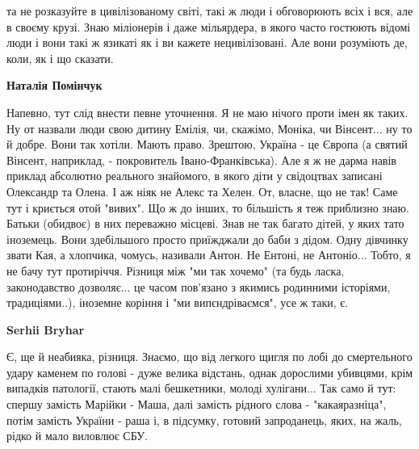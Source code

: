 \begin{itemize}
\begin{itemize}
та не розказуйте в цивілізованому світі, такі ж люди і обговорюють всіх і вся,
але в своєму крузі. Знаю міліонерів і даже мільярдера, в якого часто гостюють
відомі люди і вони такі ж язикаті як і ви кажете нецивілізовані. Але вони
розуміють де, коли, як і що сказати.


 
\textbf{Наталія Помінчук} 

Напевно, тут слід внести певне уточнення. Я не маю нічого проти імен як таких.
Ну от назвали люди свою дитину Емілія, чи, скажімо, Моніка, чи Вінсент... ну то
й добре. Вони так хотіли. Мають право. Зрештою, Україна - це Європа (а святий
Вінсент, наприклад, - покровитель Івано-Франківська). Але я ж не дарма навів
приклад абсолютно реального знайомого, в якого діти у свідоцтвах записані
Олександр та Олена. І аж ніяк не Алекс та Хелен. От, власне, що не так! Саме
тут і криється отой "вивих". Що ж до інших, то більшість я теж приблизно знаю.
Батьки (обидвоє) в них переважно місцеві. Знав не так багато дітей, у яких тато
іноземець. Вони здебільшого просто приїжджали до баби з дідом. Одну дівчинку
звати Кая, а хлопчика, чомусь, називали Антон. Не Ентоні, не Антоніо... Тобто,
я не бачу тут протиріччя. Різниця між "ми так хочемо" (та будь ласка,
законодавство дозволяє... це часом пов'язано з якимись родинними історіями,
традиціями..), іноземне коріння і "ми випєндріваємся", усе ж таки, є.

 
\textbf{Serhii Bryhar} 

Є, ще й неабияка, різниця. Знаємо, що від легкого щигля по лобі до смертельного
удару каменем по голові - дуже велика відстань, однак дорослими убивцями, крім
випадків патології, стають малі бешкетники, молоді хулігани... Так само й тут:
спершу замість Марійки - Маша, далі замість рідного слова - "какаяразніца",
потім замість України - раша і, в підсумку, готовий запроданець, яких, на жаль,
рідко й мало виловлює СБУ.


 


\end{itemize}
\end{itemize}
